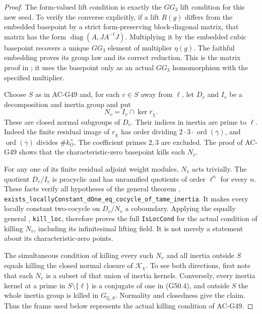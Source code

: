 \begin{proof}
The form-valued lift condition is exactly the $GG_3$ lift
condition for this new seed.  To verify the converse
explicitly, if a lift $R(g)$ differs from the embedded
basepoint by a strict form-preserving block-diagonal matrix,
that matrix has the form
$\operatorname{diag}(A,JA^{-t}J)$.
Multiplying it by the embedded cubic basepoint recovers a
unique $GG_3$ element of multiplier $\eta(g)$.
The faithful embedding proves its group law and its correct
reduction.  This is the matrix proof in
;
it uses the basepoint only as an actual $GG_3$
homomorphism with the specified multiplier.

Choose $S$ as in AC-G49 and, for each $v\in S$ away from
$\ell$, let $D_v$ and $I_v$ be a decomposition and inertia
group and put
\[
                       N_v=I_v\cap\ker\overline r_\chi.      \tag{G50.4}
\]
These are closed normal subgroups of $D_v$.
Their indices in inertia are prime to $\ell$.
Indeed the finite residual image of $r_\chi$ has order
dividing $2\cdot3\cdot\operatorname{ord}(\overline\gamma)$,
and $\operatorname{ord}(\overline\gamma)$ divides
$\#k_O^\times$.  The coefficient primes $2,3$ are excluded.
The proof of AC-G49 shows that the characteristic-zero
basepoint kills each $N_v$.

For any one of its finite residual adjoint weight modules,
$N_v$ acts trivially.  The quotient $D_v/I_v$ is procyclic
and has unramified quotients of order $\ell^n$ for every
$n$.  These facts verify all hypotheses of the general
theorem
,
\texttt{exists\_locallyConstant\_dOne\_eq\_cocycle\_of\_tame\_inertia}.
It makes every locally constant two-cocycle on $D_v/N_v$
a coboundary.  Applying the equally general
, \texttt{kill\_loc},
therefore proves the full \texttt{IsLocCond} for the actual
condition of killing $N_v$, including its infinitesimal
lifting field.  It is not merely a statement about its
characteristic-zero points.

The simultaneous condition of killing every such $N_v$
and all inertia outside $S$ equals killing the closed
normal closure of $\mathcal K_\chi$.  To see both directions,
first note that each $N_v$ is a subset of that union of
inertia kernels.  Conversely, every inertia kernel at a
prime in $S\setminus\{\ell\}$ is a conjugate of one in
(G50.4), and outside $S$ the whole inertia group is killed
in $G_{\mathbb Q,S}$.  Normality and closedness give the
claim.  Thus the frame used below represents the actual
killing condition of AC-G49.


\end{proof}
